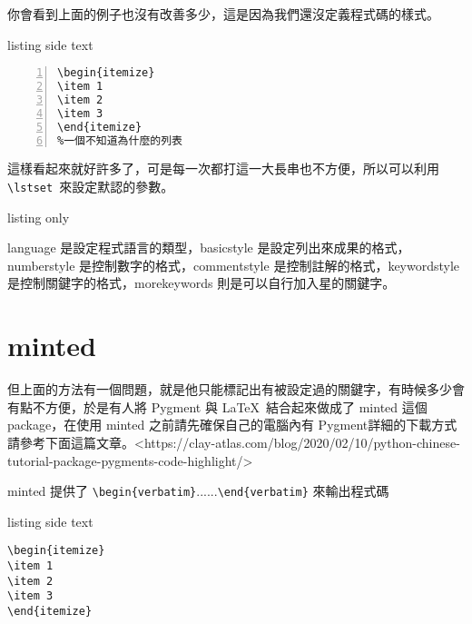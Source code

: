 你會看到上面的例子也沒有改善多少，這是因為我們還沒定義程式碼的樣式。

\begin{tcblisting}{listing side text}
\begin{lstlisting}[language={[LaTeX]TeX}, commentstyle=\color{red} ,keywordstyle=\color{blue}, numbers=left]
\begin{itemize}
\item 1
\item 2
\item 3
\end{itemize}
%一個不知道為什麼的列表
\end{lstlisting}
\end{tcblisting}

這樣看起來就好許多了，可是每一次都打這一大長串也不方便，所以可以利用 \verb`\lstset `來設定默認的參數。

\begin{tcblisting}{listing only}
\end{tcblisting}

language 是設定程式語言的類型，basicstyle 是設定列出來成果的格式，numberstyle 是控制數字的格式，commentstyle 是控制註解的格式，keywordstyle 是控制關鍵字的格式，morekeywords 則是可以自行加入星的關鍵字。

\section{minted}

但上面的方法有一個問題，就是他只能標記出有被設定過的關鍵字，有時候多少會有點不方便，於是有人將 Pygment 與 \LaTeX\ 結合起來做成了 minted 這個 package，在使用 minted 之前請先確保自己的電腦內有 Pygment詳細的下載方式請參考下面這篇文章。<https://clay-atlas.com/blog/2020/02/10/python-chinese-tutorial-package-pygments-code-highlight/>

minted 提供了 \verb`\begin{verbatim}`......\verb`\end{verbatim}` 來輸出程式碼

\begin{tcblisting}{listing side text}
\begin{verbatim}
\begin{itemize}
\item 1
\item 2
\item 3
\end{itemize}
\end{verbatim}
\end{tcblisting}

